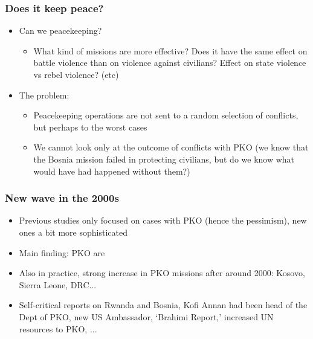 \documentclass[aspectratio=43]{beamer}
\begin{document}
\begin{frame}
\frametitle{Does it keep peace?}
\centering

\begin{itemize}[<+->]
  \item Can we {\color{red}{study}} peacekeeping?
  \begin{itemize}
    \item What kind of missions are more effective? Does it have the same effect on battle violence than on violence against civilians? Effect on state violence vs rebel violence? (etc)
  \end{itemize}
  \item The problem: {}
  \begin{itemize}
  \item Peacekeeping operations are not sent to a random selection of conflicts, but perhaps to the worst cases
  \item We cannot look only at the outcome of conflicts with PKO (we know that the Bosnia mission failed in protecting civilians, but do we know what would have had happened without them?)
  \end{itemize}
\end{itemize}

\end{frame}

\begin{frame}
\frametitle{New wave in the 2000s}
\centering

\begin{itemize}[<+->]
  \item Previous studies only focused on cases with PKO (hence the pessimism), new ones a bit more sophisticated
  \item Main finding: PKO are {\color{red}{{\color{red}{effective}}}}
  \item Also in practice, strong increase in PKO missions after around 2000: Kosovo, Sierra Leone, DRC...
  \item Self-critical reports on Rwanda and Bosnia, Kofi Annan had been head of the Dept of PKO, new US Ambassador, `Brahimi Report,' increased UN resources to PKO, ...
\end{itemize}

\end{frame}
\end{document}
